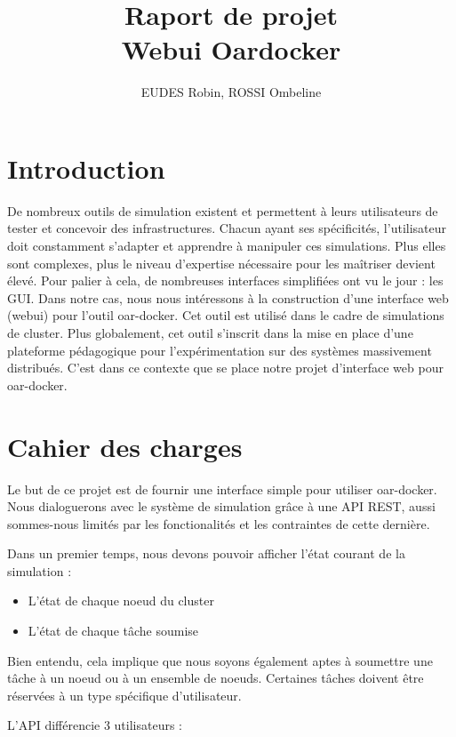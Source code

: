 \documentclass[a4paper,10pt]{article}
\title{Raport de projet \\ Webui Oardocker}
\author{EUDES Robin, ROSSI Ombeline}
\begin{document}
\maketitle
\tableofcontents
\newpage

\section{Introduction}
De nombreux outils de simulation existent et permettent à leurs utilisateurs de tester et concevoir des infrastructures. Chacun ayant ses spécificités, l'utilisateur doit constamment s'adapter et apprendre
à manipuler ces simulations. Plus elles sont complexes, plus le niveau d'expertise nécessaire pour les maîtriser devient élevé. Pour palier à cela, de nombreuses interfaces simplifiées ont vu le jour : les GUI.
Dans notre cas, nous nous intéressons à la construction d'une interface web (webui) pour l'outil oar-docker. Cet outil est utilisé dans le cadre de simulations de cluster.
Plus globalement, cet outil s'inscrit dans la mise en place d'une plateforme pédagogique pour l'expérimentation sur des systèmes massivement distribués.
C'est dans ce contexte que se place notre projet d'interface web pour oar-docker.
\section{Cahier des charges}
Le but de ce projet  est de fournir une interface simple pour utiliser oar-docker. Nous dialoguerons avec le système de simulation grâce à une API REST,
aussi sommes-nous limités par les fonctionalités et les contraintes de cette dernière.
\vspace{0.5cm}

Dans un premier temps, nous devons pouvoir afficher l'état courant de la simulation :

\begin{itemize}
 \item L'état de chaque noeud du cluster
 \item L'état de chaque tâche soumise
\end{itemize}
\vspace{0.5cm}

Bien entendu, cela implique que nous soyons également aptes à soumettre une tâche à un noeud ou à un ensemble de noeuds.
Certaines tâches doivent être réservées à un type spécifique d'utilisateur.
\vspace{0.5cm}

L'API différencie 3 utilisateurs : 
\end{document}
